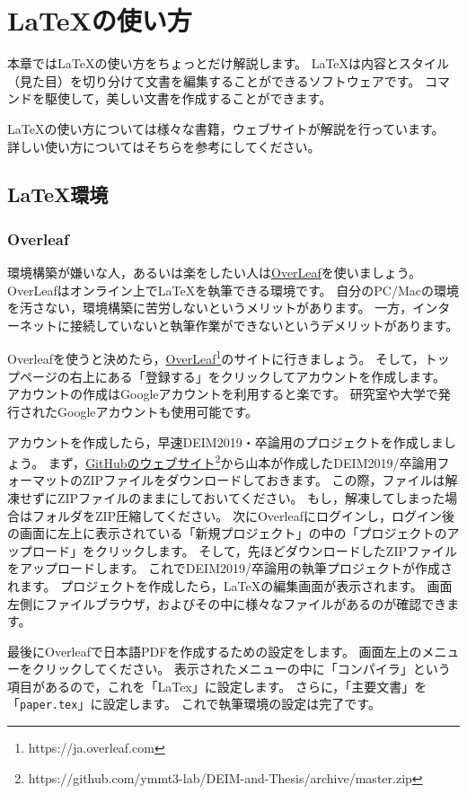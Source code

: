 \section{LaTeXの使い方}
本章ではLaTeXの使い方をちょっとだけ解説します。
LaTeXは内容とスタイル（見た目）を切り分けて文書を編集することができるソフトウェアです。
コマンドを駆使して，美しい文書を作成することができます。

LaTeXの使い方については様々な書籍，ウェブサイトが解説を行っています。
詳しい使い方についてはそちらを参考にしてください。


\subsection{LaTeX環境}
\subsubsection{Overleaf}
環境構築が嫌いな人，あるいは楽をしたい人は\href{https://ja.overleaf.com}{OverLeaf}を使いましょう。
OverLeafはオンライン上でLaTeXを執筆できる環境です。
自分のPC/Macの環境を汚さない，環境構築に苦労しないというメリットがあります。
一方，インターネットに接続していないと執筆作業ができないというデメリットがあります。

Overleafを使うと決めたら，\href{https://ja.overleaf.com}{OverLeaf}\footnote{https://ja.overleaf.com}のサイトに行きましょう。
そして，トップページの右上にある「登録する」をクリックしてアカウントを作成します。
アカウントの作成はGoogleアカウントを利用すると楽です。
研究室や大学で発行されたGoogleアカウントも使用可能です。

アカウントを作成したら，早速DEIM2019・卒論用のプロジェクトを作成しましょう。
まず，\href{https://github.com/ymmt3-lab/DEIM-and-Thesis/archive/master.zip}{GitHubのウェブサイト}\footnote{https://github.com/ymmt3-lab/DEIM-and-Thesis/archive/master.zip}から山本が作成したDEIM2019/卒論用フォーマットのZIPファイルをダウンロードしておきます。
この際，ファイルは解凍せずにZIPファイルのままにしておいてください。
もし，解凍してしまった場合はフォルダをZIP圧縮してください。
次にOverleafにログインし，ログイン後の画面に左上に表示されている「新規プロジェクト」の中の「プロジェクトのアップロード」をクリックします。
そして，先ほどダウンロードしたZIPファイルをアップロードします。
これでDEIM2019/卒論用の執筆プロジェクトが作成されます。
プロジェクトを作成したら，LaTeXの編集画面が表示されます。
画面左側にファイルブラウザ，およびその中に様々なファイルがあるのが確認できます。

最後にOverleafで日本語PDFを作成するための設定をします。
画面左上のメニューをクリックしてください。
表示されたメニューの中に「コンパイラ」という項目があるので，これを「LaTex」に設定します。
さらに，「主要文書」を「\texttt{paper.tex}」に設定します。
これで執筆環境の設定は完了です。

